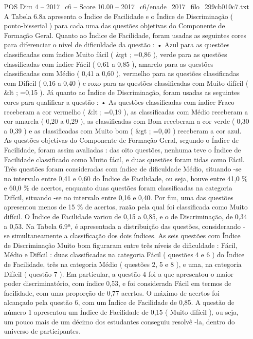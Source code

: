 \begin{textsample}{POS Dim 4 – 2017\_c6 – Score 10.00 – 2017\_c6/enade\_2017\_filo\_299cb010c7.txt}
A Tabela 6.8a apresenta o Índice de Facilidade e o Índice de Discriminação ( ponto-bisserial ) para cada uma das questões objetivas do Componente de Formação Geral.
Quanto ao Índice de Facilidade, foram usadas as seguintes cores para diferenciar o nível de dificuldade da questão : • Azul para as questões classificadas com índice Muito fácil ( \&gt ; =0,86 ), verde para as questões classificadas com índice Fácil ( 0,61 a 0,85 ), amarelo para as questões classificadas com Médio ( 0,41 a 0,60 ), vermelho para as questões classificadas com Difícil ( 0,16 a 0,40 ) e roxo para as questões classificadas com Muito difícil ( \&lt ; =0,15 ).
Já quanto ao Índice de Discriminação, foram usadas as seguintes cores para qualificar a questão : • As questões classificadas com índice Fraco receberam a cor vermelho ( \&lt ; =0,19 ), as classificadas com Médio receberam a cor amarela ( 0,20 a 0,29 ), as classificadas com Bom receberam a cor verde ( 0,30 a 0,39 ) e as classificadas com Muito bom ( \&gt ; =0,40 ) receberam a cor azul.
As questões objetivas do Componente de Formação Geral, segundo o Índice de Facilidade, foram assim avaliadas : das oito questões, nenhuma teve o Índice de Facilidade classificado como Muito fácil, e duas questões foram tidas como Fácil.
Três questões foram consideradas com índice de dificuldade Médio, situando -se no intervalo entre 0,41 e 0,60 do Índice de Facilidade, ou seja, houve entre 41,0 \% e 60,0 \% de acertos, enquanto duas questões foram classificadas na categoria Difícil, situando -se no intervalo entre 0,16 e 0,40.
Por fim, uma das questões apresentou menos de 15 \% de acertos, razão pela qual foi classificada como Muito difícil.
O Índice de Facilidade variou de 0,15 a 0,85, e o de Discriminação, de 0,34 a 0,53.
Na Tabela 6.9ª, é apresentada a distribuição das questões, considerando -se simultaneamente a classificação dos dois índices.
As seis questões com Índice de Discriminação Muito bom figuraram entre três níveis de dificuldade : Fácil, Médio e Difícil : duas classificadas na categoria Fácil ( questões 4 e 6 ) do Índice de Facilidade, três na categoria Médio ( questões 2, 5 e 8 ), e uma, na categoria Difícil ( questão 7 ).
Em particular, a questão 4 foi a que apresentou o maior poder discriminatório, com índice 0,53, e foi considerada Fácil em termos de facilidade, com uma proporção de 0,77 acertos.
O máximo de acertos foi alcançado pela questão 6, com um Índice de Facilidade de 0,85.
A questão de número 1 apresentou um Índice de Facilidade de 0,15 ( Muito difícil ), ou seja, um pouco mais de um décimo dos estudantes conseguiu resolvê -la, dentro do universo de participantes.

\end{textsample}
